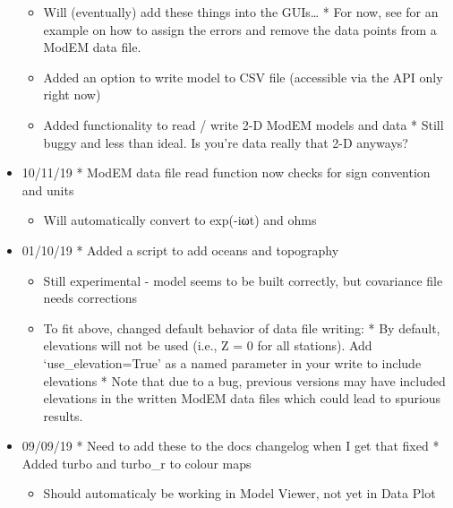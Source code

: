 \documentclass[letterpaper,10pt,english]{sphinxmanual}
\begin{document}
\begin{itemize}
\begin{itemize}
\item {} 
Will (eventually) add these things into the GUIs…
* For now, see {\hyperref[\detokenize{content/examples/recipes:recipes}]{}} for an example on how to assign the errors and remove the data points from a ModEM data file.

\end{itemize}
\begin{itemize}
\item {} 
Added an option to write model to CSV file (accessible via the API only right now)

\item {} 
Added functionality to read / write 2-D ModEM models and data
* Still buggy and less than ideal. Is you’re data really that 2-D anyways?

\end{itemize}

\item {} 
10/11/19
* ModEM data file read function now checks for sign convention and units
\begin{itemize}
\item {} 
Will automatically convert to exp(-iωt) and ohms

\end{itemize}

\item {} 
01/10/19
* Added a script to add oceans and topography
\begin{itemize}
\item {} 
Still experimental - model seems to be built correctly, but covariance file needs corrections

\end{itemize}
\begin{itemize}
\item {} 
To fit above, changed default behavior of data file writing:
* By default, elevations will not be used (i.e., Z = 0 for all stations). Add ‘use\_elevation=True’ as a named parameter in your write to include elevations
* Note that due to a bug, previous versions may have included elevations in the written ModEM data files which could lead to spurious results.

\end{itemize}

\item {} 
09/09/19
* Need to add these to the docs changelog when I get that fixed
* Added turbo and turbo\_r to colour maps
\begin{itemize}
\item {} 
Should automaticaly be working in Model Viewer, not yet in Data Plot


\end{itemize}
\end{itemize}
\end{document}
